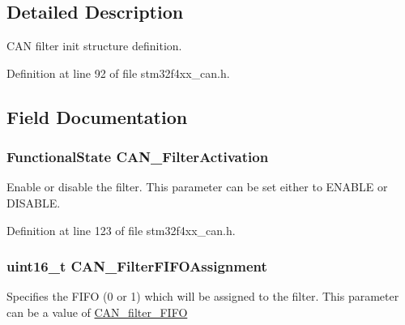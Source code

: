 \subsection{Detailed Description}
C\-A\-N filter init structure definition. 

Definition at line 92 of file stm32f4xx\-\_\-can.\-h.



\subsection{Field Documentation}
\hypertarget{struct_c_a_n___filter_init_type_def_a193c0ae1b3982478eeca47470a1ee075}{
\subsubsection[{C\-A\-N\-\_\-\-Filter\-Activation}]{\setlength{\rightskip}{0pt plus 5cm}Functional\-State C\-A\-N\-\_\-\-Filter\-Activation}}\label{struct_c_a_n___filter_init_type_def_a193c0ae1b3982478eeca47470a1ee075}
Enable or disable the filter. This parameter can be set either to E\-N\-A\-B\-L\-E or D\-I\-S\-A\-B\-L\-E. 

Definition at line 123 of file stm32f4xx\-\_\-can.\-h.

\hypertarget{struct_c_a_n___filter_init_type_def_a9581cf60f03a7c1edcd03de3783c8bf1}{
\subsubsection[{C\-A\-N\-\_\-\-Filter\-F\-I\-F\-O\-Assignment}]{\setlength{\rightskip}{0pt plus 5cm}uint16\-\_\-t C\-A\-N\-\_\-\-Filter\-F\-I\-F\-O\-Assignment}}\label{struct_c_a_n___filter_init_type_def_a9581cf60f03a7c1edcd03de3783c8bf1}
Specifies the F\-I\-F\-O (0 or 1) which will be assigned to the filter. This parameter can be a value of \hyperlink{group___c_a_n__filter___f_i_f_o}{C\-A\-N\-\_\-filter\-\_\-\-F\-I\-F\-O} 

